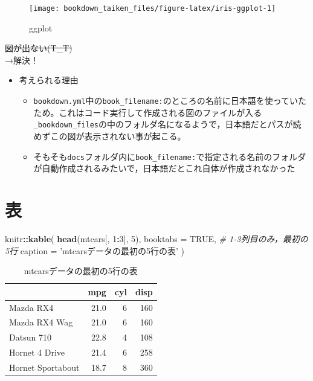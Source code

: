 \documentclass[xelatex, ja=standard, b5paper]{bxjsbook}
\newenvironment{Shaded}{\begin{snugshade}}{\end{snugshade}}
\newcommand{\CommentTok}[1]{\textcolor[rgb]{0.56,0.35,0.01}{\textit{#1}}}
\newcommand{\DataTypeTok}[1]{\textcolor[rgb]{0.13,0.29,0.53}{#1}}
\newcommand{\DecValTok}[1]{\textcolor[rgb]{0.00,0.00,0.81}{#1}}
\newcommand{\KeywordTok}[1]{\textcolor[rgb]{0.13,0.29,0.53}{\textbf{#1}}}
\newcommand{\NormalTok}[1]{#1}
\newcommand{\OperatorTok}[1]{\textcolor[rgb]{0.81,0.36,0.00}{\textbf{#1}}}
\newcommand{\OtherTok}[1]{\textcolor[rgb]{0.56,0.35,0.01}{#1}}
\newcommand{\StringTok}[1]{\textcolor[rgb]{0.31,0.60,0.02}{#1}}
\providecommand{\tightlist}{%
  \setlength{\itemsep}{0pt}\setlength{\parskip}{0pt}}
\begin{document}
\begin{figure}

{\centering \texttt{[image: bookdown\_taiken\_files/figure-latex/iris-ggplot-1]} 

}

\caption{ggplot}\label{fig:iris-ggplot}
\end{figure}

\sout{図が出ない(T\_T)}\\
→解決！

\begin{itemize}
\tightlist
\item
  考えられる理由

  \begin{itemize}
  \tightlist
  \item
    \texttt{bookdown.yml}中の\texttt{book\_filename:}のところの名前に日本語を使っていたため。これはコード実行して作成される図のファイルが入る\texttt{\_bookdown\_files}の中のフォルダ名になるようで，日本語だとパスが読めずこの図が表示されない事が起こる。
  \item
    そもそも\texttt{docs}フォルダ内に\texttt{book\_filename:}で指定される名前のフォルダが自動作成されるみたいで，日本語だとこれ自体が作成されなかった
  \end{itemize}
\end{itemize}

\hypertarget{figure_table}{%
\section{表}\label{figure_table}}

\begin{Shaded}
\begin{Highlighting}[]
\NormalTok{knitr}\OperatorTok{::}\KeywordTok{kable}\NormalTok{(}
  \KeywordTok{head}\NormalTok{(mtcars[, }\DecValTok{1}\OperatorTok{:}\DecValTok{3}\NormalTok{], }\DecValTok{5}\NormalTok{), }\DataTypeTok{booktabs =} \OtherTok{TRUE}\NormalTok{, }\CommentTok{# 1-3列目のみ，最初の5行}
  \DataTypeTok{caption =} \StringTok{'mtcarsデータの最初の5行の表'}
\NormalTok{)}
\end{Highlighting}
\end{Shaded}

\begin{table}

\caption{\label{tab:table-mtcar}mtcarsデータの最初の5行の表}
\centering
\begin{tabular}[t]{lrrr}
\toprule
  & mpg & cyl & disp\\
\midrule
Mazda RX4 & 21.0 & 6 & 160\\
Mazda RX4 Wag & 21.0 & 6 & 160\\
Datsun 710 & 22.8 & 4 & 108\\
Hornet 4 Drive & 21.4 & 6 & 258\\
Hornet Sportabout & 18.7 & 8 & 360\\
\bottomrule
\end{tabular}
\end{table}
\end{document}
